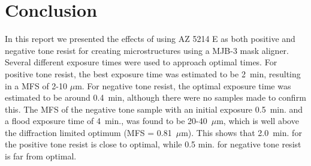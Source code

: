 \section*{Conclusion}
In this report we presented the effects of using AZ 5214 E as both positive and negative tone resist for creating microstructures using a MJB-3 mask aligner. Several different exposure times were used to approach optimal times. For positive tone resist, the best exposure time was estimated to be 2~min, resulting in a MFS of 2-10 $\mu$m. For negative tone resist, the optimal exposure time was estimated to be around 0.4~min, although there were no samples made to confirm this. The MFS of the negative tone sample with an initial exposure 0.5~min. and a flood exposure time of 4~min., was found to be 20-40~$\mu$m, which is well above the diffraction limited optimum (MFS = 0.81~$\mu$m). This shows that 2.0~min. for the positive tone resist is close to optimal, while 0.5 min. for negative tone resist is far from optimal.

